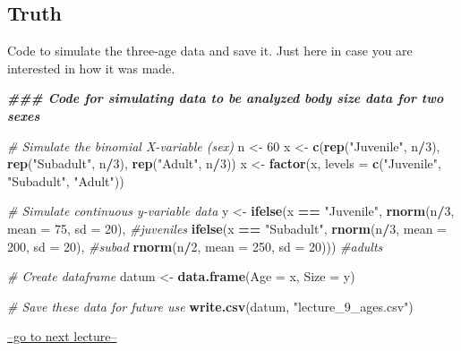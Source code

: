 \documentclass[
]{article}
\newenvironment{Shaded}{\begin{snugshade}}{\end{snugshade}}
\newcommand{\AttributeTok}[1]{\textcolor[rgb]{0.13,0.29,0.53}{#1}}
\newcommand{\CommentTok}[1]{\textcolor[rgb]{0.56,0.35,0.01}{\textit{#1}}}
\newcommand{\DecValTok}[1]{\textcolor[rgb]{0.00,0.00,0.81}{#1}}
\newcommand{\DocumentationTok}[1]{\textcolor[rgb]{0.56,0.35,0.01}{\textbf{\textit{#1}}}}
\newcommand{\FunctionTok}[1]{\textcolor[rgb]{0.13,0.29,0.53}{\textbf{#1}}}
\newcommand{\NormalTok}[1]{#1}
\newcommand{\OtherTok}[1]{\textcolor[rgb]{0.56,0.35,0.01}{#1}}
\newcommand{\SpecialCharTok}[1]{\textcolor[rgb]{0.81,0.36,0.00}{\textbf{#1}}}
\newcommand{\StringTok}[1]{\textcolor[rgb]{0.31,0.60,0.02}{#1}}
\begin{document}
\subsection{Truth}\label{truth}

Code to simulate the three-age data and save it. Just here in case you
are interested in how it was made.

\begin{Shaded}
\begin{Highlighting}[]
\DocumentationTok{\#\#\# Code for simulating data to be analyzed body size data for two sexes}

\CommentTok{\# Simulate the binomial X{-}variable (sex)}
\NormalTok{n }\OtherTok{\textless{}{-}} \DecValTok{60}
\NormalTok{x }\OtherTok{\textless{}{-}} \FunctionTok{c}\NormalTok{(}\FunctionTok{rep}\NormalTok{(}\StringTok{"Juvenile"}\NormalTok{, n}\SpecialCharTok{/}\DecValTok{3}\NormalTok{), }\FunctionTok{rep}\NormalTok{(}\StringTok{"Subadult"}\NormalTok{, n}\SpecialCharTok{/}\DecValTok{3}\NormalTok{), }\FunctionTok{rep}\NormalTok{(}\StringTok{"Adult"}\NormalTok{, n}\SpecialCharTok{/}\DecValTok{3}\NormalTok{))}
\NormalTok{x }\OtherTok{\textless{}{-}} \FunctionTok{factor}\NormalTok{(x, }\AttributeTok{levels =} \FunctionTok{c}\NormalTok{(}\StringTok{"Juvenile"}\NormalTok{, }\StringTok{"Subadult"}\NormalTok{, }\StringTok{"Adult"}\NormalTok{))}

\CommentTok{\# Simulate continuous y{-}variable data}
\NormalTok{y }\OtherTok{\textless{}{-}} \FunctionTok{ifelse}\NormalTok{(x }\SpecialCharTok{==} \StringTok{"Juvenile"}\NormalTok{, }\FunctionTok{rnorm}\NormalTok{(n}\SpecialCharTok{/}\DecValTok{3}\NormalTok{, }\AttributeTok{mean =} \DecValTok{75}\NormalTok{, }\AttributeTok{sd =} \DecValTok{20}\NormalTok{), }\CommentTok{\#juveniles}
            \FunctionTok{ifelse}\NormalTok{(x }\SpecialCharTok{==} \StringTok{"Subadult"}\NormalTok{, }\FunctionTok{rnorm}\NormalTok{(n}\SpecialCharTok{/}\DecValTok{3}\NormalTok{, }\AttributeTok{mean =} \DecValTok{200}\NormalTok{, }\AttributeTok{sd =} \DecValTok{20}\NormalTok{), }\CommentTok{\#subad}
              \FunctionTok{rnorm}\NormalTok{(n}\SpecialCharTok{/}\DecValTok{2}\NormalTok{, }\AttributeTok{mean =} \DecValTok{250}\NormalTok{, }\AttributeTok{sd =} \DecValTok{20}\NormalTok{))) }\CommentTok{\#adults}

\CommentTok{\# Create dataframe}
\NormalTok{datum }\OtherTok{\textless{}{-}} \FunctionTok{data.frame}\NormalTok{(}\AttributeTok{Age =}\NormalTok{ x, }\AttributeTok{Size =}\NormalTok{ y)}

\CommentTok{\# Save these data for future use}
\FunctionTok{write.csv}\NormalTok{(datum, }\StringTok{"lecture\_9\_ages.csv"}\NormalTok{)}
\end{Highlighting}
\end{Shaded}

\href{lecture_10.html}{--go to next lecture--}
\end{document}
